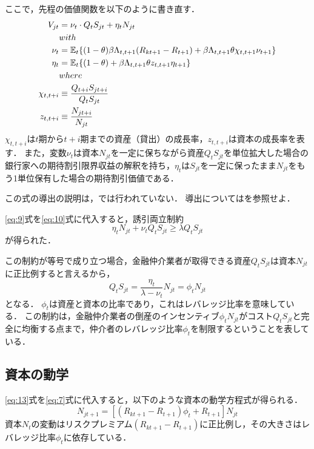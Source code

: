 \documentclass[dvipdfmx]{jlreq}
\begin{document}
ここで，先程の価値関数を以下のように書き直す．
\begin{align}
  V_{jt} &= \nu_t \cdot Q_t S_{jt} + \eta_t N_{jt} \label{eq:10} \\
  &with \notag \\
  \nu_t &= \mathbb{E}_t \{(1-\theta) \beta \Lambda_{t,t+1} (R_{kt+1} - R_{t+1}) + \beta \Lambda_{t,t+1} \theta \chi_{t,t+1} \nu_{t+1}\} \\
  \eta_t &= \mathbb{E}_t \{(1-\theta) + \beta \Lambda_{t,t+1} \theta z_{t,t+1} \eta_{t+1}\} \\
  &where \notag \\
  \chi_{t,t+i} &\equiv \frac{Q_{t+i} S_{jt+i}}{Q_t S_{jt}} \\
  z_{t,t+i} &\equiv \frac{N_{jt+i}}{N_{jt}}
\end{align}
$\chi_{t,t+i}$は$t$期から$t+i$期までの資産（貸出）の成長率，$z_{t,t+i}$は資本の成長率を表す．
また，変数$\nu_t$は資本$N_{jt}$を一定に保ちながら資産$Q_t S_{jt}$を単位拡大した場合の銀行家への期待割引限界収益の解釈を持ち，$\eta_t$は$S_{jt}$を一定に保ったまま$N_{jt}$をもう1単位保有した場合の期待割引価値である．

この式の導出の説明は，\textcite{GK2011}では行われていない．
導出については\textcite{V2021}を参照せよ．

\eqref{eq:9}式を\eqref{eq:10}式に代入すると，誘引両立制約
\begin{equation}
  \eta_t N_{jt} + \nu_t Q_t S_{jt} \geq \lambda Q_t S_{jt}
\end{equation}
が得られた．

この制約が等号で成り立つ場合，金融仲介業者が取得できる資産$Q_t S_{jt}$は資本$N_{jt}$に正比例すると言えるから，
\begin{equation} \label{eq:13}
  Q_t S_{jt} = \frac{\eta_t}{\lambda-\nu_t} N_{jt} = \phi_t N_{jt}
\end{equation}
となる．
$\phi_t$は資産と資本の比率であり，これはレバレッジ比率を意味している．
この制約は，金融仲介業者の倒産のインセンティブ$\phi_t N_{jt}$がコスト$Q_t S_{jt}$と完全に均衡する点まで，仲介者のレバレッジ比率$\phi_t$を制限するということを表している．

\subsection*{資本の動学}
\eqref{eq:13}式を\eqref{eq:7}式に代入すると，以下のような資本の動学方程式が得られる．
\begin{equation} \label{eq:14}
  N_{jt+1} = [(R_{kt+1} - R_{t+1}) \phi_t + R_{t+1}] N_{jt}
\end{equation}
資本$N_t$の変動はリスクプレミアム$(R_{kt+1} - R_{t+1})$に正比例し，その大きさはレバレッジ比率$\phi_t$に依存している．
\end{document}
